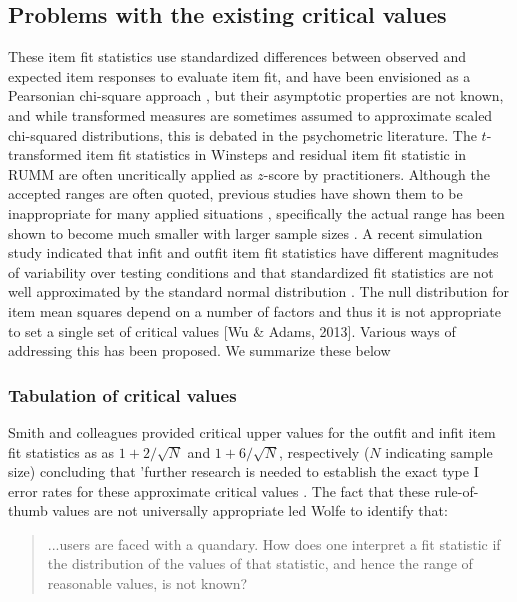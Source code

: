\documentclass{article}
\begin{document}
\subsection{Problems with the existing critical values}

These item fit statistics use standardized differences between observed and expected item responses to evaluate item fit, and have been envisioned as a Pearsonian chi-square approach \cite{Smith1991}, but their asymptotic properties are not known, and while transformed measures are sometimes assumed to approximate scaled chi-squared distributions, this is debated in the psychometric literature. The $t$-transformed item fit statistics in Winsteps and residual item fit statistic in RUMM are often uncritically applied as $z$-score by practitioners. Although the accepted ranges are often quoted, previous studies have shown them to be inappropriate for many applied situations \cite{Smith-Schumacker-Bush}, specifically the actual range has been shown to become much smaller with larger sample sizes \cite{Smith1991,Wang-Chen_2005,Hagell-Westergren2016}. A recent simulation study indicated that infit and outfit item fit statistics have different magnitudes of variability over testing conditions and that standardized fit statistics are not well approximated by the standard normal distribution \cite{Seol2016}. The null distribution for item mean squares depend on a number of factors and thus it is not appropriate to set a single set of critical values [Wu \& Adams, 2013]. Various ways of addressing this has been proposed. We summarize these below

\subsubsection*{Tabulation of critical values}


Smith and colleagues provided critical upper values for the outfit and infit item fit statistics as as $1+2/\sqrt{N}$ and $1+6/\sqrt{N}$, respectively ($N$ indicating sample size) \cite{Smith-Schumacker-Bush} concluding that 'further research is needed to establish the exact type I error rates for these approximate critical values \cite[p. 78]{Smith-Schumacker-Bush}. The fact that these rule-of-thumb values are not universally appropriate led Wolfe to identify that:

\begin{quote}
...users are faced with a quandary. How does one interpret a fit statistic if the distribution of the values of that statistic, and hence the range of reasonable values, is not known? \cite{Wolfe2013}
\end{quote}
\end{document}
